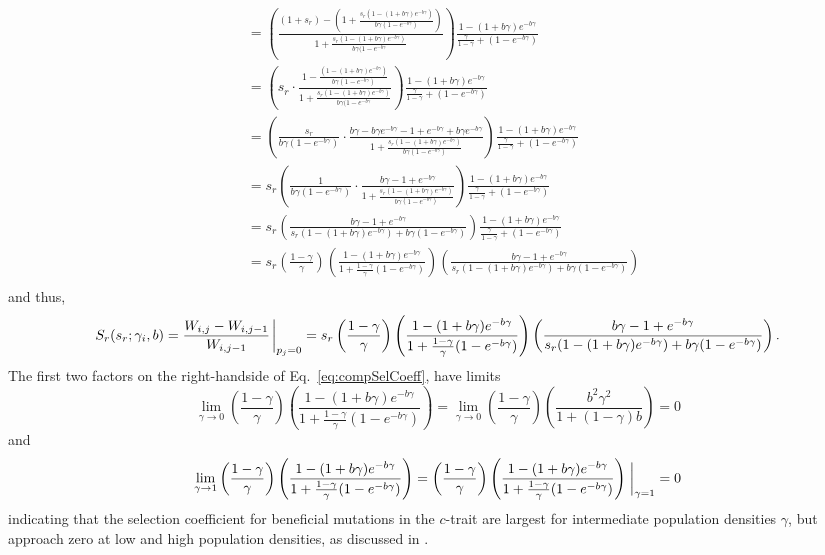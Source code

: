 \documentclass[9pt,twocolumn,twoside]{article}
\begin{document}
\begin{appendix}
\[\begin{aligned}
&= \left( \frac{(1+s_r)-\left(1+ \frac{s_r(1-(1+b\gamma)e^{-b\gamma})}{b\gamma(1-e^{-b\gamma})}\right)}{1+ \frac{s_r(1-(1+b\gamma)e^{-b\gamma})}{b\gamma(1-e^{-b\gamma}}}\right)\frac{1-(1+b\gamma)e^{-b\gamma }}{\frac{\gamma}{1-\gamma}+(1-e^{-b\gamma })}\\[4pt]
&= \left( s_r\cdot\frac{1- \frac{(1-(1+b\gamma)e^{-b\gamma})}{b\gamma(1-e^{-b\gamma})}}{1+ \frac{s_r(1-(1+b\gamma)e^{-b\gamma})}{b\gamma(1-e^{-b\gamma}}}\right)\frac{1-(1+b\gamma)e^{-b\gamma }}{\frac{\gamma}{1-\gamma}+(1-e^{-b\gamma })}\\[4pt]
&= \left( \frac{s_r}{b\gamma(1-e^{-b\gamma})}\cdot\frac{b\gamma-b\gamma e^{-b\gamma}- 1+e^{-b\gamma}+b\gamma e^{-b\gamma}}{1+ \frac{s_r(1-(1+b\gamma)e^{-b\gamma})}{b\gamma(1-e^{-b\gamma})}}\right)\frac{1-(1+b\gamma)e^{-b\gamma }}{\frac{\gamma}{1-\gamma}+(1-e^{-b\gamma })}\\[4pt]
&= s_r \left( \frac{1}{b\gamma(1-e^{-b\gamma})}\cdot\frac{b\gamma -1 +e^{-b\gamma}}{1+ \frac{s_r(1-(1+b\gamma)e^{-b\gamma})}{b\gamma(1-e^{-b\gamma})}}\right)\frac{1-(1+b\gamma)e^{-b\gamma }}{\frac{\gamma}{1-\gamma}+(1-e^{-b\gamma })}\\[4pt]
&= s_r \left( \frac{b\gamma -1 +e^{-b\gamma}}{{s_r(1-(1+b\gamma)e^{-b\gamma})}+{b\gamma(1-e^{-b\gamma})}}\right)\frac{1-(1+b\gamma)e^{-b\gamma }}{\frac{\gamma}{1-\gamma}+(1-e^{-b\gamma })}\\[4pt]
&= s_r \left(\frac{1-\gamma}{\gamma}\right)\left(\frac{1-(1+b\gamma)e^{-b\gamma }}{1+\frac{1-\gamma}{\gamma}(1-e^{-b\gamma })}\right)\left( \frac{b\gamma-1+e^{-b\gamma}}{{s_r(1-(1+b\gamma)e^{-b\gamma})}+{b\gamma(1-e^{-b\gamma})}}\right)\\[4pt]
\end{aligned}
\]
and thus, 
\begin{equation} \label{eq:compSelCoeff}
S_{r}(s_{r};\gamma_{i},b)=\frac{W_{i,j}-W_{i,j-1}}{W_{i,j-1}}\eval_{p_j=0}= s_r \left(\frac{1-\gamma}{\gamma}\right)\left(\frac{1-(1+b\gamma)e^{-b\gamma }}{1+\frac{1-\gamma}{\gamma}(1-e^{-b\gamma })}\right)\left( \frac{b\gamma-1+e^{-b\gamma}}{{s_r(1-(1+b\gamma)e^{-b\gamma})}+{b\gamma(1-e^{-b\gamma})}}\right).
\end{equation}
The first two factors on the right-handside of Eq.~\eqref{eq:compSelCoeff}, have limits
\[
\lim_{\gamma\rightarrow 0} \left(\frac{1-\gamma}{\gamma}\right)\left(\frac{1-(1+b\gamma)e^{-b\gamma }}{1+\frac{1-\gamma}{\gamma}(1-e^{-b\gamma })}\right) = \lim_{\gamma\rightarrow 0} \left(\frac{1-\gamma}{\gamma}\right)\left(\frac{b^2\gamma^2}{1+(1-\gamma)b}\right) = 0
\]
and
\[
\lim_{\gamma\rightarrow 1} \left(\frac{1-\gamma}{\gamma}\right)\left(\frac{1-(1+b\gamma)e^{-b\gamma }}{1+\frac{1-\gamma}{\gamma}(1-e^{-b\gamma })}\right) =  \left(\frac{1-\gamma}{\gamma}\right)\left(\frac{1-(1+b\gamma)e^{-b\gamma }}{1+\frac{1-\gamma}{\gamma}(1-e^{-b\gamma })}\right)\eval_{\gamma=1}=0
\]
indicating that the selection coefficient for beneficial mutations in the $c$-trait are largest for intermediate population densities $\gamma$, but approach zero at low and high population densities, as discussed in \cite{bertram2019density}.


\end{appendix}
\end{document}
